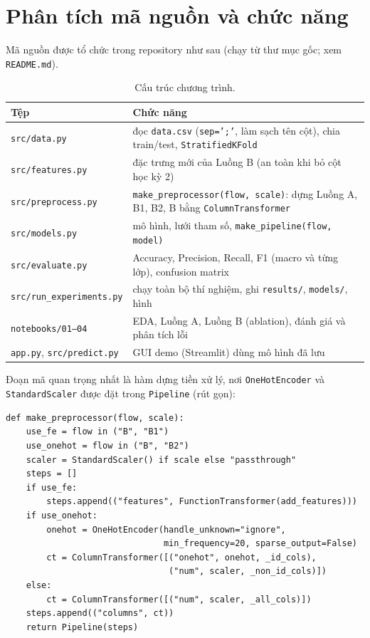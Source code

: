 \documentclass[12pt,a4paper]{article}
\begin{document}
\section{Phân tích mã nguồn và chức năng}
Mã nguồn được tổ chức trong repository như sau (chạy từ thư mục gốc; xem \texttt{README.md}).
\begin{table}[H]\centering\small
\begin{tabular}{@{}lp{9.3cm}@{}}\toprule
Tệp & Chức năng\\\midrule
\texttt{src/data.py} & đọc \texttt{data.csv} (\texttt{sep=';'}, làm sạch tên cột), chia train/test, \texttt{StratifiedKFold}\\
\texttt{src/features.py} & đặc trưng mới của Luồng B (an toàn khi bỏ cột học kỳ 2)\\
\texttt{src/preprocess.py} & \texttt{make\_preprocessor(flow, scale)}: dựng Luồng A, B1, B2, B bằng \texttt{ColumnTransformer}\\
\texttt{src/models.py} & mô hình, lưới tham số, \texttt{make\_pipeline(flow, model)}\\
\texttt{src/evaluate.py} & Accuracy, Precision, Recall, F1 (macro và từng lớp), confusion matrix\\
\texttt{src/run\_experiments.py} & chạy toàn bộ thí nghiệm, ghi \texttt{results/}, \texttt{models/}, hình\\
\texttt{notebooks/01--04} & EDA, Luồng A, Luồng B (ablation), đánh giá và phân tích lỗi\\
\texttt{app.py}, \texttt{src/predict.py} & GUI demo (Streamlit) dùng mô hình đã lưu\\\bottomrule
\end{tabular}\caption{Cấu trúc chương trình.}\end{table}
Đoạn mã quan trọng nhất là hàm dựng tiền xử lý, nơi \texttt{OneHotEncoder} và \texttt{StandardScaler} được đặt trong \texttt{Pipeline}
(rút gọn):
\begin{small}\begin{verbatim}
def make_preprocessor(flow, scale):
    use_fe = flow in ("B", "B1")
    use_onehot = flow in ("B", "B2")
    scaler = StandardScaler() if scale else "passthrough"
    steps = []
    if use_fe:
        steps.append(("features", FunctionTransformer(add_features)))
    if use_onehot:
        onehot = OneHotEncoder(handle_unknown="ignore",
                               min_frequency=20, sparse_output=False)
        ct = ColumnTransformer([("onehot", onehot, _id_cols),
                                ("num", scaler, _non_id_cols)])
    else:
        ct = ColumnTransformer([("num", scaler, _all_cols)])
    steps.append(("columns", ct))
    return Pipeline(steps)
\end{verbatim}\end{small}
\end{document}
